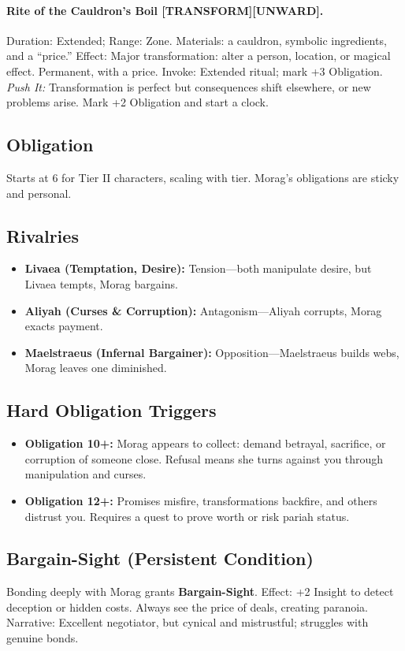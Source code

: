 \paragraph{Rite of the Cauldron's Boil [TRANSFORM][UNWARD].} Duration: Extended; Range: Zone.  
Materials: a cauldron, symbolic ingredients, and a ``price.''  
Effect: Major transformation: alter a person, location, or magical effect. Permanent, with a price.  
Invoke: Extended ritual; mark +3 Obligation.  
\emph{Push It:} Transformation is perfect but consequences shift elsewhere, or new problems arise. Mark +2 Obligation and start a clock.

\subsection*{Obligation}
Starts at 6 for Tier II characters, scaling with tier. Morag’s obligations are sticky and personal.

\subsection*{Rivalries}
\begin{itemize}
  \item \textbf{Livaea (Temptation, Desire):} Tension---both manipulate desire, but Livaea tempts, Morag bargains.  
  \item \textbf{Aliyah (Curses \& Corruption):} Antagonism---Aliyah corrupts, Morag exacts payment.  
  \item \textbf{Maelstraeus (Infernal Bargainer):} Opposition---Maelstraeus builds webs, Morag leaves one diminished.  
\end{itemize}

\subsection*{Hard Obligation Triggers}
\begin{itemize}
  \item \textbf{Obligation 10+:} Morag appears to collect: demand betrayal, sacrifice, or corruption of someone close. Refusal means she turns against you through manipulation and curses.  
  \item \textbf{Obligation 12+:} Promises misfire, transformations backfire, and others distrust you. Requires a quest to prove worth or risk pariah status.  
\end{itemize}

\subsection*{Bargain-Sight (Persistent Condition)}
Bonding deeply with Morag grants \textbf{Bargain-Sight}.  
Effect: +2 Insight to detect deception or hidden costs. Always see the price of deals, creating paranoia.  
Narrative: Excellent negotiator, but cynical and mistrustful; struggles with genuine bonds.
